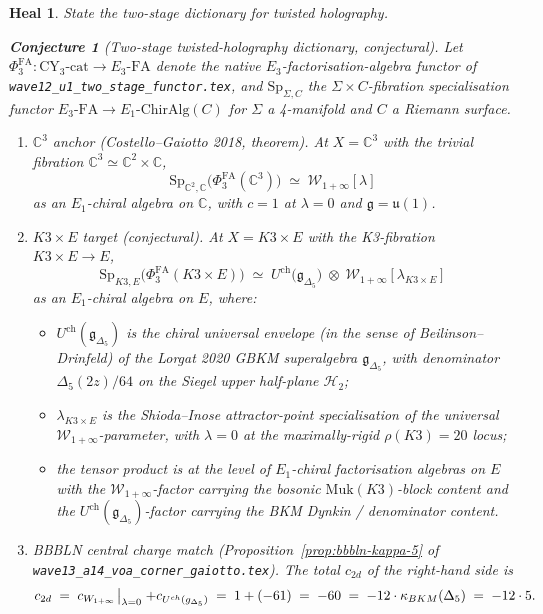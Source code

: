 \documentclass[11pt]{article}
\newtheorem{conjecture}[theorem]{Conjecture}
\newtheorem*{heal}{Heal}
\providecommand{\Eone}{E_1}
\providecommand{\Ethree}{E_3}
\providecommand{\C}{\mathbb{C}}
\providecommand{\cW}{\mathcal{W}}
\providecommand{\cH}{\mathcal{H}}
\providecommand{\fg}{\mathfrak{g}}
\providecommand{\fu}{\mathfrak{u}}
\providecommand{\ChirAlg}{\mathrm{ChirAlg}}
\providecommand{\Sp}{\mathrm{Sp}}
\providecommand{\BKM}{\mathrm{BKM}}
\providecommand{\Muk}{\mathrm{Muk}}
\begin{document}
\begin{heal}
State the two-stage dictionary for twisted holography.
\begin{conjecture}[Two-stage twisted-holography dictionary, conjectural]
\label{conj:two-stage-th}
Let $\Phi^{\mathrm{FA}}_3: \mathrm{CY}_3\text{-cat} \to \Ethree\text{-}\mathrm{FA}$
denote the native $\Ethree$-factorisation-algebra functor of
\texttt{wave12\_u1\_two\_stage\_functor.tex}, and $\Sp_{\Sigma,C}$ the
$\Sigma\times C$-fibration specialisation functor
$\Ethree\text{-}\mathrm{FA} \to \Eone\text{-}\ChirAlg(C)$ for
$\Sigma$ a 4-manifold and $C$ a Riemann surface.
\begin{enumerate}[leftmargin=2em]
\item \emph{$\C^3$ anchor (Costello--Gaiotto 2018, theorem).} At
$X = \C^3$ with the trivial fibration $\C^3 \simeq \C^2 \times \C$,
\[
  \Sp_{\C^2,\C}\bigl(\Phi^{\mathrm{FA}}_3(\C^3)\bigr)
  \;\simeq\;
  \cW_{1+\infty}[\lambda]
\]
as an $\Eone$-chiral algebra on $\C$, with $c = 1$ at
$\lambda = 0$ and $\fg = \fu(1)$.
\item \emph{$K3 \times E$ target (conjectural).} At
$X = K3\times E$ with the K3-fibration $K3\times E \to E$,
\[
  \Sp_{K3,E}\bigl(\Phi^{\mathrm{FA}}_3(K3\times E)\bigr)
  \;\simeq\;
  U^{\mathrm{ch}}\bigl(\fg_{\Delta_5}\bigr)
  \;\otimes\;
  \cW_{1+\infty}[\lambda_{K3\times E}]
\]
as an $\Eone$-chiral algebra on $E$, where:
\begin{itemize}[leftmargin=1em]
\item $U^{\mathrm{ch}}(\fg_{\Delta_5})$ is the chiral universal
envelope (in the sense of Beilinson--Drinfeld) of the Lorgat 2020 GBKM
superalgebra $\fg_{\Delta_5}$, with denominator $\Delta_5(2z)/64$ on
the Siegel upper half-plane $\cH_2$;
\item $\lambda_{K3\times E}$ is the Shioda--Inose attractor-point
specialisation of the universal $\cW_{1+\infty}$-parameter, with
$\lambda = 0$ at the maximally-rigid $\rho(K3) = 20$ locus;
\item the tensor product is at the level of $\Eone$-chiral
factorisation algebras on $E$ with the $\cW_{1+\infty}$-factor
carrying the bosonic $\Muk(K3)$-block content and the
$U^{\mathrm{ch}}(\fg_{\Delta_5})$-factor carrying the BKM
Dynkin / denominator content.
\end{itemize}
\item \emph{BBBLN central charge match (Proposition~\ref{prop:bbbln-kappa-5}
of \texttt{wave13\_a14\_voa\_corner\_gaiotto.tex}).} The total
$c_{2d}$ of the right-hand side is
\[
  c_{2d} \;=\;
  c_{\cW_{1+\infty}}\!\bigm|_{\lambda = 0} + c_{U^{\mathrm{ch}}(\fg_{\Delta_5})}
  \;=\;
  1 + (-61)
  \;=\;
  -60
  \;=\;
  -12\cdot\kappa_{\BKM}(\Delta_5)
  \;=\;
  -12\cdot 5.
\]
\end{enumerate}
\end{conjecture}


\end{heal}
\end{document}
